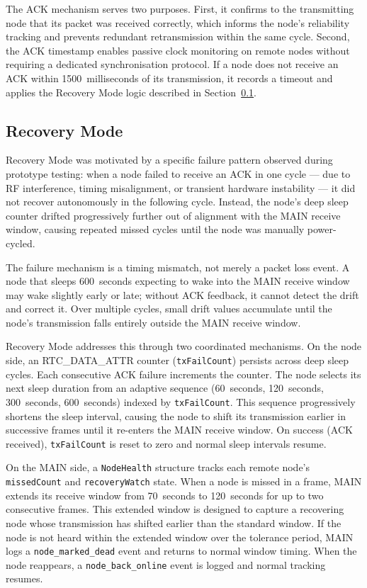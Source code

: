 The ACK mechanism serves two purposes. First, it confirms to the transmitting node that its packet was received correctly, which informs the node's reliability tracking and prevents redundant retransmission within the same cycle. Second, the ACK timestamp enables passive clock monitoring on remote nodes without requiring a dedicated synchronisation protocol. If a node does not receive an ACK within 1500~milliseconds of its transmission, it records a timeout and applies the Recovery Mode logic described in Section~\ref{sec:mode-recovery}.

\subsection{Recovery Mode}
\label{sec:mode-recovery}

Recovery Mode was motivated by a specific failure pattern observed during prototype testing: when a node failed to receive an ACK in one cycle — due to RF interference, timing misalignment, or transient hardware instability — it did not recover autonomously in the following cycle. Instead, the node's deep sleep counter drifted progressively further out of alignment with the MAIN receive window, causing repeated missed cycles until the node was manually power-cycled.

The failure mechanism is a timing mismatch, not merely a packet loss event. A node that sleeps 600~seconds expecting to wake into the MAIN receive window may wake slightly early or late; without ACK feedback, it cannot detect the drift and correct it. Over multiple cycles, small drift values accumulate until the node's transmission falls entirely outside the MAIN receive window.

Recovery Mode addresses this through two coordinated mechanisms. On the node side, an RTC\_DATA\_ATTR counter (\texttt{txFailCount}) persists across deep sleep cycles. Each consecutive ACK failure increments the counter. The node selects its next sleep duration from an adaptive sequence (60~seconds, 120~seconds, 300~seconds, 600~seconds) indexed by \texttt{txFailCount}. This sequence progressively shortens the sleep interval, causing the node to shift its transmission earlier in successive frames until it re-enters the MAIN receive window. On success (ACK received), \texttt{txFailCount} is reset to zero and normal sleep intervals resume.

On the MAIN side, a \texttt{NodeHealth} structure tracks each remote node's \texttt{missedCount} and \texttt{recoveryWatch} state. When a node is missed in a frame, MAIN extends its receive window from 70~seconds to 120~seconds for up to two consecutive frames. This extended window is designed to capture a recovering node whose transmission has shifted earlier than the standard window. If the node is not heard within the extended window over the tolerance period, MAIN logs a \texttt{node\_marked\_dead} event and returns to normal window timing. When the node reappears, a \texttt{node\_back\_online} event is logged and normal tracking resumes.

